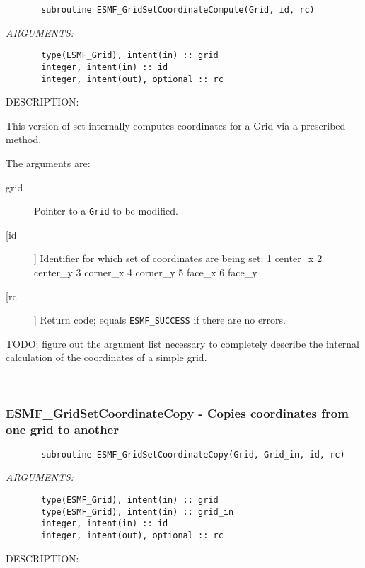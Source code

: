 { 
\begin{verbatim}       subroutine ESMF_GridSetCoordinateCompute(Grid, id, rc)\end{verbatim}{\em ARGUMENTS:}
\begin{verbatim}       type(ESMF_Grid), intent(in) :: grid
       integer, intent(in) :: id
       integer, intent(out), optional :: rc\end{verbatim}
{\sf DESCRIPTION:\\ }


       This version of set internally computes coordinates for a Grid via a
       prescribed method.
  
       The arguments are:
       \begin{description}
       \item[grid] 
            Pointer to a {\tt Grid} to be modified.
       \item[[id]]
            Identifier for which set of coordinates are being set:
               1  center\_x
               2  center\_y
               3  corner\_x
               4  corner\_y
               5  face\_x
               6  face\_y 
       \item[[rc]] 
            Return code; equals {\tt ESMF\_SUCCESS} if there are no errors.
       \end{description}
  
  TODO: figure out the argument list necessary to completely describe the 
        internal calculation of the coordinates of a simple grid. 
 
\mbox{}\hrulefill\ 
 
\subsubsection{ESMF\_GridSetCoordinateCopy - Copies coordinates from one grid to another}


 
\begin{verbatim}       subroutine ESMF_GridSetCoordinateCopy(Grid, Grid_in, id, rc)\end{verbatim}{\em ARGUMENTS:}
\begin{verbatim}       type(ESMF_Grid), intent(in) :: grid
       type(ESMF_Grid), intent(in) :: grid_in
       integer, intent(in) :: id
       integer, intent(out), optional :: rc\end{verbatim}
{\sf DESCRIPTION:\\ }


}
